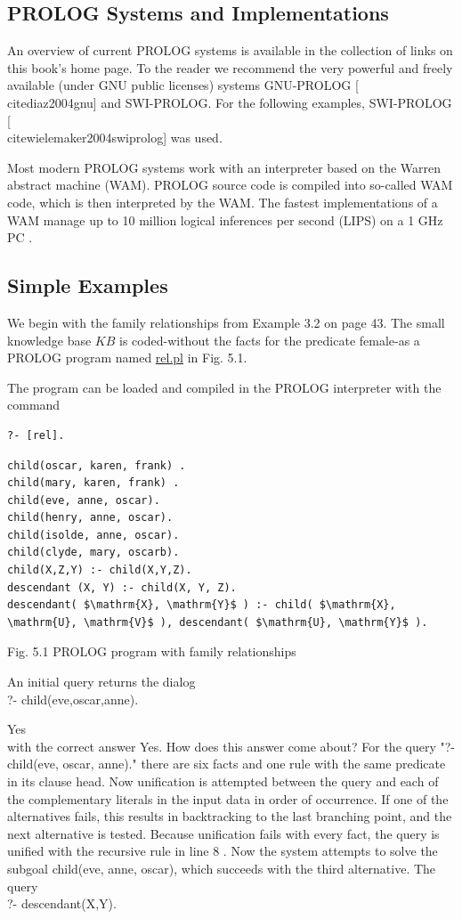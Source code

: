 \documentclass[10pt]{book}
\begin{document}
\subsection*{PROLOG Systems and Implementations}
An overview of current PROLOG systems is available in the collection of links on this book's home page. To the reader we recommend the very powerful and freely available (under GNU public licenses) systems GNU-PROLOG [\\cite{diaz2004gnu}] and SWI-PROLOG. For the following examples, SWI-PROLOG [\\cite{wielemaker2004swiprolog}] was used.

Most modern PROLOG systems work with an interpreter based on the Warren abstract machine (WAM). PROLOG source code is compiled into so-called WAM code, which is then interpreted by the WAM. The fastest implementations of a WAM manage up to 10 million logical inferences per second (LIPS) on a 1 GHz PC .

\subsection*{Simple Examples}
We begin with the family relationships from Example 3.2 on page 43. The small knowledge base $K B$ is coded-without the facts for the predicate female-as a PROLOG program named \href{http://rel.pl}{rel.pl} in Fig. 5.1.

The program can be loaded and compiled in the PROLOG interpreter with the command

\begin{verbatim}
?- [rel].
\end{verbatim}

\begin{verbatim}
child(oscar, karen, frank) .
child(mary, karen, frank) .
child(eve, anne, oscar).
child(henry, anne, oscar).
child(isolde, anne, oscar).
child(clyde, mary, oscarb).
child(X,Z,Y) :- child(X,Y,Z).
descendant (X, Y) :- child(X, Y, Z).
descendant( $\mathrm{X}, \mathrm{Y}$ ) :- child( $\mathrm{X}, \mathrm{U}, \mathrm{V}$ ), descendant( $\mathrm{U}, \mathrm{Y}$ ).
\end{verbatim}

Fig. 5.1 PROLOG program with family relationships

An initial query returns the dialog\\
?- child(eve,oscar,anne).

Yes\\
with the correct answer Yes. How does this answer come about? For the query "?- child(eve, oscar, anne)." there are six facts and one rule with the same predicate in its clause head. Now unification is attempted between the query and each of the complementary literals in the input data in order of occurrence. If one of the alternatives fails, this results in backtracking to the last branching point, and the next alternative is tested. Because unification fails with every fact, the query is unified with the recursive rule in line 8 . Now the system attempts to solve the subgoal child(eve, anne, oscar), which succeeds with the third alternative. The query\\
?- descendant(X,Y).
\end{document}
